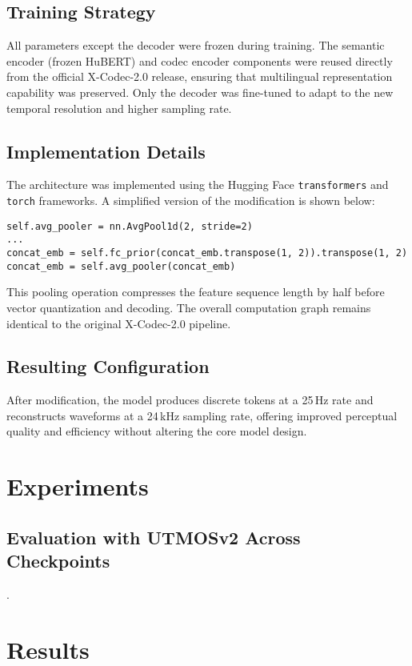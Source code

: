 \documentclass[preprint]{article}
\begin{document}
\subsection{Training Strategy}
All parameters except the decoder were frozen during training. The semantic encoder (frozen HuBERT) and codec encoder components were reused directly from the official X-Codec-2.0 release, ensuring that multilingual representation capability was preserved. Only the decoder was fine-tuned to adapt to the new temporal resolution and higher sampling rate.

\subsection{Implementation Details}
The architecture was implemented using the Hugging Face \texttt{transformers} and \texttt{torch} frameworks. A simplified version of the modification is shown below:
\begin{verbatim}
self.avg_pooler = nn.AvgPool1d(2, stride=2)
...
concat_emb = self.fc_prior(concat_emb.transpose(1, 2)).transpose(1, 2)
concat_emb = self.avg_pooler(concat_emb)
\end{verbatim}
This pooling operation compresses the feature sequence length by half before vector quantization and decoding. The overall computation graph remains identical to the original X-Codec-2.0 pipeline.

\subsection{Resulting Configuration}
After modification, the model produces discrete tokens at a 25\,Hz rate and reconstructs waveforms at a 24\,kHz sampling rate, offering improved perceptual quality and efficiency without altering the core model design.


\section{Experiments}

\subsection{Evaluation with UTMOSv2 Across Checkpoints}

.

\section{Results}
\end{document}
